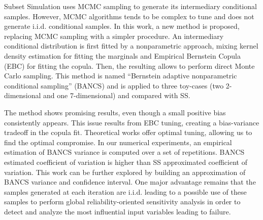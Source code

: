 Subset Simulation uses MCMC sampling to generate its intermediary conditional samples. 
However, MCMC algorithms tends to be complex to tune and does not generate i.i.d. conditional samples. 
In this work, a new method is proposed, replacing MCMC sampling with a simpler procedure. 
An intermediary conditional distribution is first fitted by a nonparametric approach, mixing kernel density estimation for fitting the marginals and Empirical Bernstein Copula (EBC) for fitting the copula. 
Then, the resulting allows to perform direct Monte Carlo sampling. 
This method is named ``Bernstein adaptive nonparametric conditional sampling'' (BANCS) and is applied to three toy-cases (two 2-dimensional and one 7-dimensional) and compared with SS.

The method shows promising results, even though a small positive bias consistently appears. 
This issue results from EBC tuning, creating a bias-variance tradeoff in the copula fit. 
Theoretical works offer optimal tuning, allowing us to find the optimal compromise. 
In our numerical experiments, an empirical estimation of BANCS variance is computed over a set of repetitions. 
BANCS estimated coefficient of variation is higher than SS approximated coefficient of variation. 
This work can be further explored by building an approximation of BANCS variance and confidence interval. 
One major advantage remains that the samples generated at each iteration are i.i.d. leading to a possible use of these samples to perform global reliability-oriented sensitivity analysis \citep{marrel_chabridon_2021} 
in order to detect and analyze the most influential input variables leading to failure.



